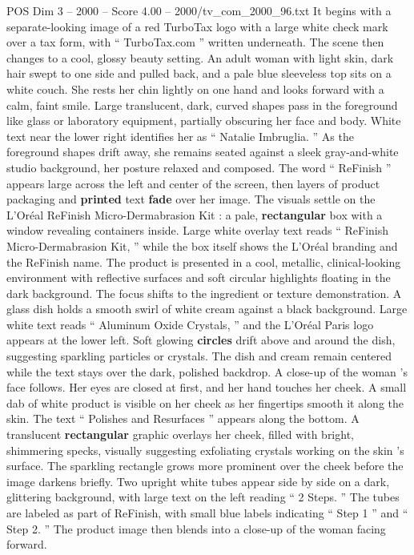 \begin{textsample}{POS Dim 3 – 2000 – Score 4.00 – 2000/tv\_com\_2000\_96.txt}  \label{ex:f3_pos_068}
It begins with a separate-looking image of a red TurboTax logo with a large white check mark over a tax form, with “ TurboTax.com ” written underneath.
The scene then changes to a cool, glossy beauty setting.
An adult woman with light skin, dark hair swept to one side and pulled back, and a pale blue sleeveless top sits on a white couch.
She rests her chin lightly on one hand and looks forward with a calm, faint smile.
Large translucent, dark, curved shapes pass in the foreground like glass or laboratory equipment, partially obscuring her face and body.
White text near the lower right identifies her as “ Natalie Imbruglia. ” As the foreground shapes drift away, she remains seated against a sleek gray-and-white studio background, her posture relaxed and composed.
The word “ ReFinish ” appears large across the left and center of the screen, then layers of product packaging and \textbf{printed} text \textbf{fade} over her image.
The visuals settle on the L’Oréal ReFinish Micro-Dermabrasion Kit : a pale, \textbf{rectangular} box with a window revealing containers inside.
Large white overlay text reads “ ReFinish Micro-Dermabrasion Kit, ” while the box itself shows the L’Oréal branding and the ReFinish name.
The product is presented in a cool, metallic, clinical-looking environment with reflective surfaces and soft circular highlights floating in the dark background.
The focus shifts to the ingredient or texture demonstration.
A glass dish holds a smooth swirl of white cream against a black background.
Large white text reads “ Aluminum Oxide Crystals, ” and the L’Oréal Paris logo appears at the lower left.
Soft glowing \textbf{circles} drift above and around the dish, suggesting sparkling particles or crystals.
The dish and cream remain centered while the text stays over the dark, polished backdrop.
A close-up of the woman ’s face follows.
Her eyes are closed at first, and her hand touches her cheek.
A small dab of white product is visible on her cheek as her fingertips smooth it along the skin.
The text “ Polishes and Resurfaces ” appears along the bottom.
A translucent \textbf{rectangular} graphic overlays her cheek, filled with bright, shimmering specks, visually suggesting exfoliating crystals working on the skin ’s surface.
The sparkling rectangle grows more prominent over the cheek before the image darkens briefly.
Two upright white tubes appear side by side on a dark, glittering background, with large text on the left reading “ 2 Steps. ” The tubes are labeled as part of ReFinish, with small blue labels indicating “ Step 1 ” and “ Step 2. ” The product image then blends into a close-up of the woman facing forward.

\end{textsample}
